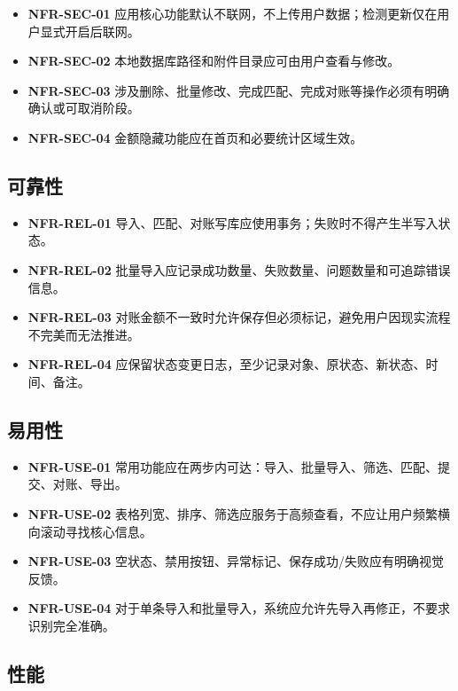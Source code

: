 \documentclass[UTF8,zihao=-4]{ctexart}
\newcommand{\req}[1]{\textbf{\textcolor{ivicBrown}{#1}}}
\begin{document}
\begin{itemize}
  \item \req{NFR-SEC-01} 应用核心功能默认不联网，不上传用户数据；检测更新仅在用户显式开启后联网。
  \item \req{NFR-SEC-02} 本地数据库路径和附件目录应可由用户查看与修改。
  \item \req{NFR-SEC-03} 涉及删除、批量修改、完成匹配、完成对账等操作必须有明确确认或可取消阶段。
  \item \req{NFR-SEC-04} 金额隐藏功能应在首页和必要统计区域生效。
\end{itemize}

\subsection{可靠性}

\begin{itemize}
  \item \req{NFR-REL-01} 导入、匹配、对账写库应使用事务；失败时不得产生半写入状态。
  \item \req{NFR-REL-02} 批量导入应记录成功数量、失败数量、问题数量和可追踪错误信息。
  \item \req{NFR-REL-03} 对账金额不一致时允许保存但必须标记，避免用户因现实流程不完美而无法推进。
  \item \req{NFR-REL-04} 应保留状态变更日志，至少记录对象、原状态、新状态、时间、备注。
\end{itemize}

\subsection{易用性}

\begin{itemize}
  \item \req{NFR-USE-01} 常用功能应在两步内可达：导入、批量导入、筛选、匹配、提交、对账、导出。
  \item \req{NFR-USE-02} 表格列宽、排序、筛选应服务于高频查看，不应让用户频繁横向滚动寻找核心信息。
  \item \req{NFR-USE-03} 空状态、禁用按钮、异常标记、保存成功/失败应有明确视觉反馈。
  \item \req{NFR-USE-04} 对于单条导入和批量导入，系统应允许先导入再修正，不要求识别完全准确。
\end{itemize}

\subsection{性能}
\end{document}
